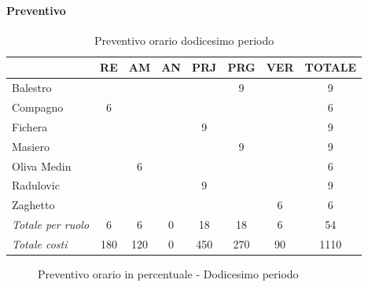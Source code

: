 \documentclass[a4paper,12pt]{article}
\begin{document}
            \paragraph{Preventivo}
                \begin{table}[H]
                \centering
                \caption{Preventivo orario dodicesimo periodo}
                \begin{tabular}{|l|c|c|c|c|c|c|c|}
                \hline
                    \rowcolor{lightgray}{\textbf{Membro}} & {\textbf{RE}} & {\textbf{AM}} & {\textbf{AN}} & {\textbf{PRJ}} & {\textbf{PRG}} & {\textbf{VER}} & {\textbf{TOTALE}}\\
                \hline
                    Balestro & & & & & 9 & & 9\\
                \hline
                    Compagno & 6 & & & & & & 6\\
                \hline
                    Fichera & & & & 9 & & & 9\\
                \hline
                    Masiero & & & & & 9 & & 9\\
                \hline
                    Oliva Medin & & 6 & & & & & 6\\
                \hline
                    Radulovic & & & & 9 & & & 9\\
                \hline
                    Zaghetto & & & & & & 6 & 6\\
                \hline
                    \rowcolor{lightgray}\textit{Totale per ruolo} & 6 & 6 & 0 & 18 & 18 & 6 & 54\\
                \hline
                    \rowcolor{lightgray}\textit{Totale costi} & 180 & 120 & 0 & 450 & 270 & 90 & 1110\\
                \hline
                \end{tabular}
                \end{table}

                \begin{figure}[H]
                \centering
                \caption{Preventivo orario in percentuale - Dodicesimo periodo}
                \end{figure}
                
\end{document}
